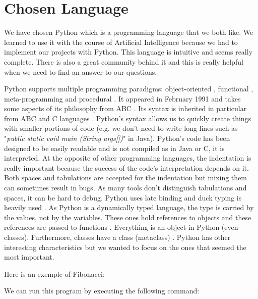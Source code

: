 \section{Chosen Language}
We have chosen Python which is a programming language that we both like. We learned to use it with the course of Artificial Intelligence because we had to implement our projects with Python. This language is intuitive and seems really complete. There is also a great community behind it and this is really helpful when we need to find an answer to our questions.

Python supports multiple programming paradigms: object-oriented \cite{martelli2006python} \cite{functional_doc}, functional \cite{functional_doc} \cite{devtome}, meta-programming \cite{mihai} and procedural \cite{martelli2006python} \cite{functional_doc}.
It appeared in February 1991 and takes some aspects of its philosophy from ABC \cite{python_why}. Its syntax is inherited in particular from ABC and C languages \cite{wikipediaEN_history_python}. Python's syntax allows us to quickly create things with smaller portions of code (e.g. we don't need to write long lines such as "\textit{public static void main (String args[])}" in Java).
Python's code has been designed to be easily readable \cite{ZenPython} and is not compiled as in Java or C, it is interpreted.
At the opposite of other programming languages, the indentation is really important because the success of the code's interpretation depends on it. Both spaces and tabulations are accepted for the indentation but mixing them can sometimes result in bugs. As many tools don't distinguish tabulations and spaces, it can be hard to debug.
Python uses late binding \cite{python_pep0289} and duck typing is heavily used \cite{wikipediaEN_duck_typing_python}.
As Python is a dynamically typed language, the type is carried by the values, not by the variables. These ones hold references to objects and these references are passed to functions \cite{wikipediaEN_python_syntax_semantics}.
Everything is an object in Python (even classes). Furthermore, classes have a class (metaclass) \cite{python_datamodel}.
Python has other interesting characteristics but we wanted to focus on the ones that seemed the most important.
\newline

Here is an exemple of Fibonacci:


We can run this program by executing the following command:


